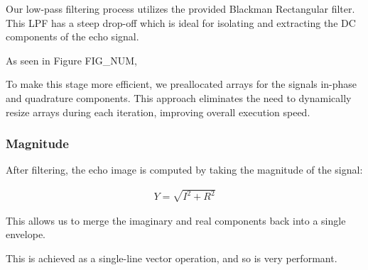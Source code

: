 Our low-pass filtering process utilizes the provided Blackman Rectangular filter. This LPF has 
a steep drop-off which is ideal for isolating and extracting the DC components of the echo signal.

As seen in Figure FIG_NUM, 

To make this stage more efficient, we preallocated arrays for the signals in-phase and quadrature
components. This approach eliminates the need to dynamically resize arrays during each iteration,
improving overall execution speed.


\subsubsection{Magnitude}

After filtering, the echo image is computed by taking the magnitude of the signal: 

\begin{align*}
    Y = \sqrt{I^2 + R^2}
\end{align*}

This allows us to merge the imaginary and real components back into a single envelope.

This is achieved as a single-line vector operation, and so is very performant.
